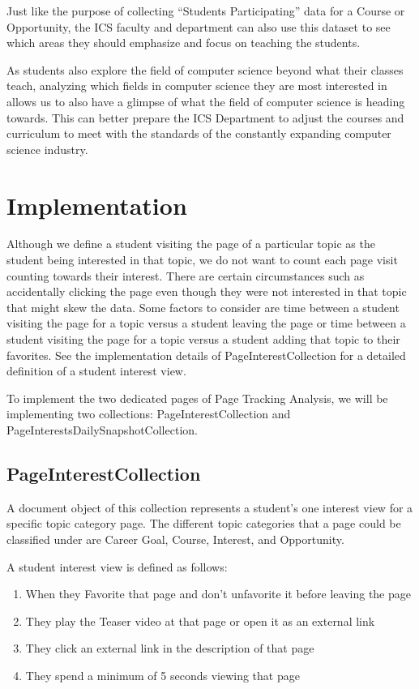 \documentclass[english]{proposalnsf}
\begin{document}
  Just like the purpose of collecting ``Students Participating'' data for a Course or Opportunity, the ICS faculty and
  department can also use this dataset to see which areas they should emphasize and focus on teaching the students.

  As students also explore the field of computer science beyond what their classes teach, analyzing which fields in
  computer science they are most interested in allows us to also have a glimpse of what the field of computer science
  is heading towards. This can better prepare the ICS Department to adjust the courses and curriculum to meet with the
  standards of the constantly expanding computer science industry.

  \section{Implementation}
  \label{sec:implementation}
  Although we define a student visiting the page of a particular topic as the student being interested in that topic,
  we do not want to count each page visit counting towards their interest. There are certain circumstances such as accidentally clicking the page even though they were not interested in that topic that might skew the data. Some factors to consider are time between a student visiting the page for a topic versus a student leaving the page or time between a student visiting the page for a topic versus a student adding that topic to their favorites. See the implementation details of PageInterestCollection for a detailed definition of a student interest view.

  To implement the two dedicated pages of Page Tracking Analysis, we will be implementing two collections: PageInterestCollection and PageInterestsDailySnapshotCollection.
      
  \subsection{PageInterestCollection}
  \label{sec:pageinterestcollection}
    A document object of this collection represents a student's one interest view for a specific topic category page. The different topic categories that a page could be classified under are Career Goal, Course, Interest, and Opportunity.

    A student interest view is defined as follows:
    \begin{enumerate}
        \item When they Favorite that page and don't unfavorite it before leaving the page
        \item They play the Teaser video at that page or open it as an external link
        \item They click an external link in the description of that page
        \item They spend a minimum of 5 seconds viewing that page
    \end{enumerate}
\end{document}
